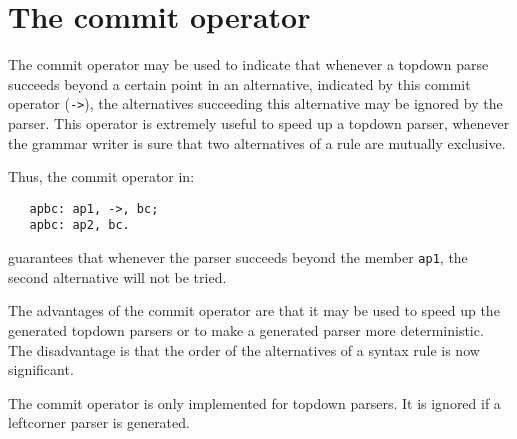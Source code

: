 \section {The commit operator}
The commit operator may be used to indicate that whenever a topdown
parse succeeds beyond a certain point in an alternative, indicated by
this commit operator (\verb+->+), the alternatives succeeding this
alternative may be ignored by the parser. This operator is extremely
useful to speed up a topdown parser, whenever the grammar writer is sure
that two alternatives of a rule are mutually exclusive.

Thus, the commit operator in:
\begin{verbatim}
   apbc: ap1, ->, bc;
   apbc: ap2, bc.
\end{verbatim}
guarantees that whenever the parser succeeds beyond the member {\tt ap1},
the second alternative will not be tried.

The advantages of the commit operator are that it may be used to
speed up the generated topdown parsers or to make a generated parser
more deterministic. The disadvantage is that the order of the
alternatives of a syntax rule is now significant.

The commit operator is only implemented for topdown parsers. It is ignored
if a leftcorner parser is generated.
